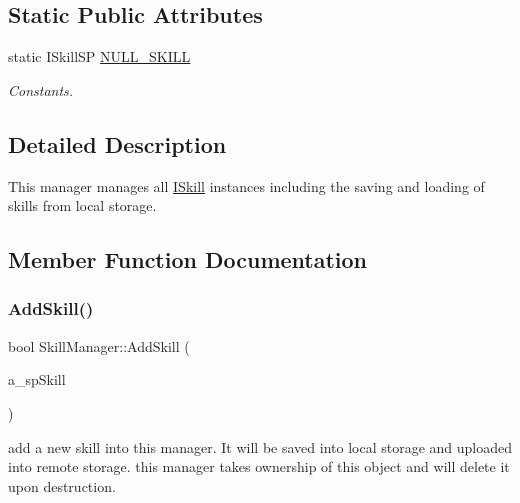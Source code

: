 \subsection*{Static Public Attributes}
\begin{DoxyCompactItemize}
\item 
\mbox{\label{class_skill_manager_aec8b450284bdf756e1eaaf5d87adaf33}} 
static I\+Skill\+SP \hyperlink{class_skill_manager_aec8b450284bdf756e1eaaf5d87adaf33}{N\+U\+L\+L\+\_\+\+S\+K\+I\+LL}
\begin{DoxyCompactList}\small\item\em Constants. \end{DoxyCompactList}\end{DoxyCompactItemize}


\subsection{Detailed Description}
This manager manages all \hyperlink{class_i_skill}{I\+Skill} instances including the saving and loading of skills from local storage. 

\subsection{Member Function Documentation}
\mbox{\label{class_skill_manager_a27b25eebb68ae5679073b4c3bf472857}} 
\subsubsection{\texorpdfstring{Add\+Skill()}{AddSkill()}}
{\footnotesize\ttfamily bool Skill\+Manager\+::\+Add\+Skill (\begin{DoxyParamCaption}\item[{const \hyperlink{class_i_skill_a68bcce999ab0444eebaca3fb8ddb8a31}{I\+Skill\+::\+SP} \&}]{a\+\_\+sp\+Skill }\end{DoxyParamCaption})}

add a new skill into this manager. It will be saved into local storage and uploaded into remote storage. this manager takes ownership of this object and will delete it upon destruction. \mbox{\label{class_skill_manager_a93d4f06cba6013263d249a52d0cd8e8c}} 
